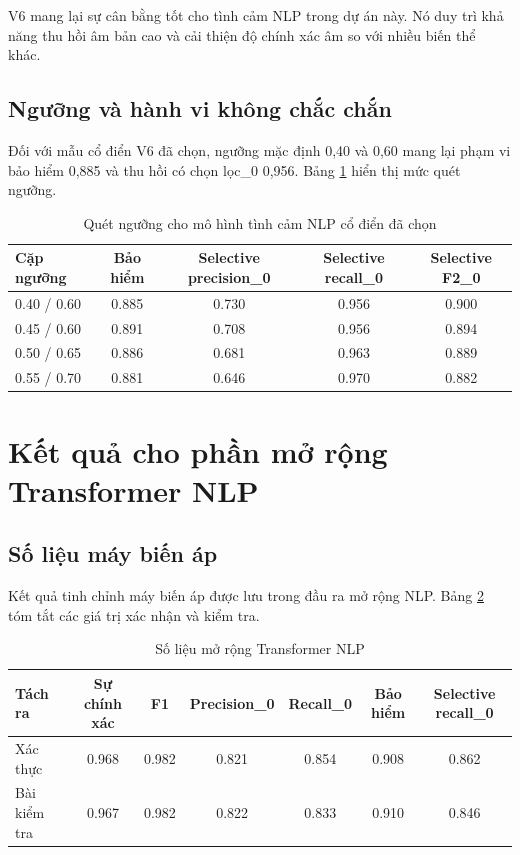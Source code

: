 \documentclass[12pt,a4paper]{article}
\begin{document}
V6 mang lại sự cân bằng tốt cho tình cảm NLP trong dự án này. Nó duy trì khả năng thu hồi âm bản cao và cải thiện độ chính xác âm so với nhiều biến thể khác.

\subsection{Ngưỡng và hành vi không chắc chắn}
Đối với mẫu cổ điển V6 đã chọn, ngưỡng mặc định 0,40 và 0,60 mang lại phạm vi bảo hiểm 0,885 và thu hồi có chọn lọc\_0 0,956. Bảng \ref{tab:nlp_classic_threshold} hiển thị mức quét ngưỡng.

\begin{table}[H]
\centering
\caption{Quét ngưỡng cho mô hình tình cảm NLP cổ điển đã chọn}
\label{tab:nlp_classic_threshold}
\begin{tabular}{lcccc}
\toprule
Cặp ngưỡng & Bảo hiểm & Selective precision\_0 & Selective recall\_0 & Selective F2\_0 \\
\midrule
0.40 / 0.60 & 0.885 & 0.730 & 0.956 & 0.900 \\
0.45 / 0.60 & 0.891 & 0.708 & 0.956 & 0.894 \\
0.50 / 0.65 & 0.886 & 0.681 & 0.963 & 0.889 \\
0.55 / 0.70 & 0.881 & 0.646 & 0.970 & 0.882 \\
\bottomrule
\end{tabular}
\end{table}

\section{Kết quả cho phần mở rộng Transformer NLP}
\subsection{Số liệu máy biến áp}
Kết quả tinh chỉnh máy biến áp được lưu trong đầu ra mở rộng NLP. Bảng \ref{tab:nlp_transformer_metrics} tóm tắt các giá trị xác nhận và kiểm tra.

\begin{table}[H]
\centering
\caption{Số liệu mở rộng Transformer NLP}
\label{tab:nlp_transformer_metrics}
\begin{tabular}{lcccccc}
\toprule
Tách ra & Sự chính xác & F1 & Precision\_0 & Recall\_0 & Bảo hiểm & Selective recall\_0 \\
\midrule
Xác thực & 0.968 & 0.982 & 0.821 & 0.854 & 0.908 & 0.862 \\
Bài kiểm tra & 0.967 & 0.982 & 0.822 & 0.833 & 0.910 & 0.846 \\
\bottomrule
\end{tabular}
\end{table}
\end{document}
